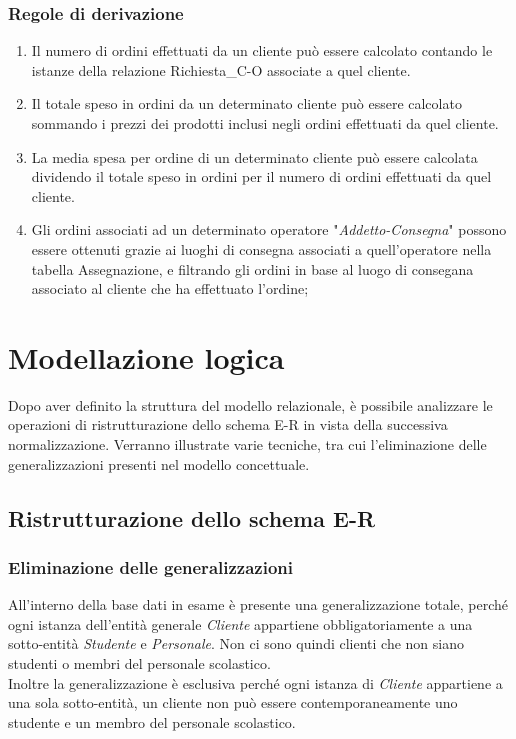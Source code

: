 \documentclass[12pt,a4paper]{article}
\begin{document}
    \subsubsection{Regole di derivazione}
    \begin{enumerate}[leftmargin=3em,label=\textbf{(RD\arabic*)}]
        \item  Il numero di ordini effettuati da un cliente può essere calcolato contando le istanze della relazione Richiesta\_C-O associate a quel cliente.
        \item Il totale speso in ordini da un determinato cliente può essere calcolato sommando i prezzi dei prodotti inclusi negli ordini effettuati da quel cliente.
        \item La media spesa per ordine di un determinato cliente può essere calcolata dividendo il totale speso in ordini per il numero di ordini effettuati da quel cliente.
        \item Gli ordini associati ad un determinato operatore "\textit{Addetto-Consegna}" possono essere ottenuti grazie ai luoghi di consegna associati a quell'operatore nella tabella Assegnazione, e filtrando gli ordini in base al luogo di consegana associato al cliente che ha effettuato l'ordine; 
    \end{enumerate}

    \newpage
    \section{Modellazione logica}
    Dopo aver definito la struttura del modello relazionale, è possibile analizzare le operazioni  di ristrutturazione dello schema E-R in vista della successiva normalizzazione. Verranno illustrate varie tecniche, tra cui l'eliminazione delle generalizzazioni presenti nel modello concettuale.

    \subsection{Ristrutturazione dello schema E-R}
    \subsubsection{Eliminazione delle generalizzazioni}
    All'interno della base dati in esame è presente una generalizzazione totale, perché ogni istanza dell'entità generale \textit{Cliente} appartiene obbligatoriamente a una sotto-entità \textit{Studente} e \textit{Personale}. Non ci sono quindi clienti che non siano studenti o membri del personale scolastico.\\
    Inoltre la generalizzazione è esclusiva perché ogni istanza di \textit{Cliente} appartiene a una sola sotto-entità, un cliente non può essere contemporaneamente uno studente e un membro del personale scolastico.
\end{document}
